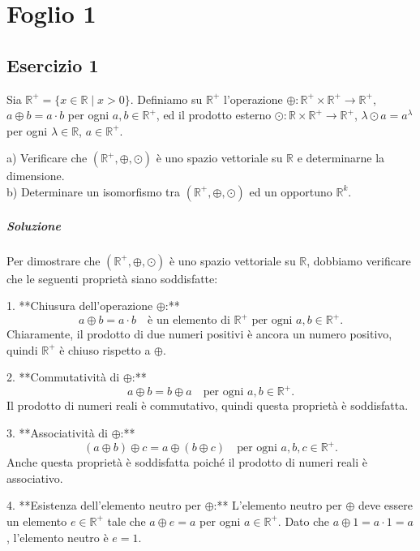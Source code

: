 \section{Foglio 1}

	

	
	\subsection{Esercizio 1} Sia \(\mathbb{R}^+ = \{x \in \mathbb{R} \mid x > 0\}\). Definiamo su \(\mathbb{R}^+\) l'operazione \(\oplus : \mathbb{R}^+ \times \mathbb{R}^+ \to \mathbb{R}^+\), \(a \oplus b = a \cdot b\) per ogni \(a, b \in \mathbb{R}^+\), ed il prodotto esterno \(\odot : \mathbb{R} \times \mathbb{R}^+ \to \mathbb{R}^+\), \(\lambda \odot a = a^\lambda\) per ogni \(\lambda \in \mathbb{R}\), \(a \in \mathbb{R}^+\).
	
	
	a) Verificare che \((\mathbb{R}^+, \oplus, \odot)\) è uno spazio vettoriale su \(\mathbb{R}\) e determinarne la dimensione. \\
	b) Determinare un isomorfismo tra \((\mathbb{R}^+, \oplus, \odot)\) ed un opportuno \(\mathbb{R}^k\). \\
	
	\subparagraph{Soluzione}
	Per dimostrare che \((\mathbb{R}^+, \oplus, \odot)\) è uno spazio vettoriale su \(\mathbb{R}\), dobbiamo verificare che le seguenti proprietà siano soddisfatte:
	
	1. **Chiusura dell'operazione \(\oplus\):**
	\[
	a \oplus b = a \cdot b \quad \text{è un elemento di } \mathbb{R}^+ \text{ per ogni } a, b \in \mathbb{R}^+.
	\]
	Chiaramente, il prodotto di due numeri positivi è ancora un numero positivo, quindi \(\mathbb{R}^+\) è chiuso rispetto a \(\oplus\).
	
	2. **Commutatività di \(\oplus\):**
	\[
	a \oplus b = b \oplus a \quad \text{per ogni } a, b \in \mathbb{R}^+.
	\]
	Il prodotto di numeri reali è commutativo, quindi questa proprietà è soddisfatta.
	
	3. **Associatività di \(\oplus\):**
	\[
	(a \oplus b) \oplus c = a \oplus (b \oplus c) \quad \text{per ogni } a, b, c \in \mathbb{R}^+.
	\]
	Anche questa proprietà è soddisfatta poiché il prodotto di numeri reali è associativo.
	
	4. **Esistenza dell'elemento neutro per \(\oplus\):**
	L'elemento neutro per \(\oplus\) deve essere un elemento \(e \in \mathbb{R}^+\) tale che \(a \oplus e = a\) per ogni \(a \in \mathbb{R}^+\). Dato che \(a \oplus 1 = a \cdot 1 = a\), l'elemento neutro è \(e = 1\).
	
